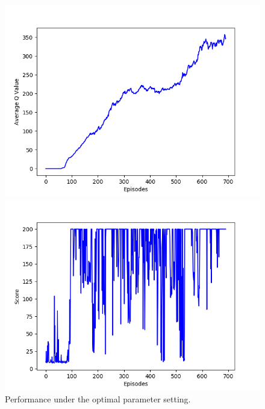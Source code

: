\documentclass{article}
\begin{document}
\begin{figure}[H]
  \centering
  \begin{minipage}{0.49\textwidth}
    \centering
    \includegraphics[scale=0.45]{../experiments/final/qvalues.png}
  \end{minipage}
  \begin{minipage}{0.49\textwidth}
    \centering
    \includegraphics[scale=0.45]{../experiments/final/scores.png}
  \end{minipage}
  \caption{Performance under the optimal parameter setting.}
  \label{final}
\end{figure}
\end{document}
